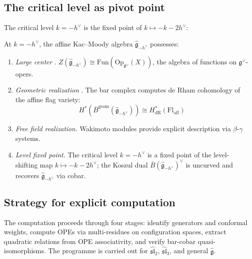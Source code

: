 \subsection{The critical level as pivot point}

The critical level $k = -h^\vee$ is the fixed point of $k \mapsto -k-2h^\vee$:

\begin{theorem}\label{thm:critical-level-structure}
At $k = -h^\vee$, the affine Kac--Moody algebra $\widehat{\mathfrak{g}}_{-h^\vee}$ possesses:
\begin{enumerate}
\item \emph{Large center} \cite{Feigin-Frenkel}. $Z(\widehat{\mathfrak{g}}_{-h^\vee}) \cong \mathrm{Fun}(\mathrm{Op}_{\mathfrak{g}^\vee}(X))$, the algebra of functions on $\mathfrak{g}^\vee$-opers.
\item \emph{Geometric realization} \cite{Feigin-Frenkel}. The bar complex computes de Rham cohomology of the affine flag variety:
\begin{equation}
H^*(\bar{B}^{\mathrm{geom}}(\widehat{\mathfrak{g}}_{-h^\vee})) \cong H^*_{\mathrm{dR}}(\mathrm{Fl}_{\mathrm{aff}})
\end{equation}
\item \emph{Free field realization.} Wakimoto modules provide explicit description via $\beta$-$\gamma$ systems.
\item \emph{Level fixed point.} The critical level $k = -h^\vee$ is a fixed point of the level-shifting map $k \mapsto -k-2h^\vee$; the Koszul dual $\bar{B}(\widehat{\mathfrak{g}}_{-h^\vee})^\vee$ is uncurved and recovers $\widehat{\mathfrak{g}}_{-h^\vee}$ via cobar.
\end{enumerate}
\end{theorem}

\subsection{Strategy for explicit computation}

\begin{remark}[Strategy]
The computation proceeds through four stages: identify generators and conformal weights, compute OPEs via multi-residues on configuration spaces, extract quadratic relations from OPE associativity, and verify bar-cobar quasi-isomorphisms.  The programme is carried out for $\widehat{\mathfrak{sl}}_2$, $\widehat{\mathfrak{sl}}_3$, and general $\widehat{\mathfrak{g}}$.
\end{remark}

